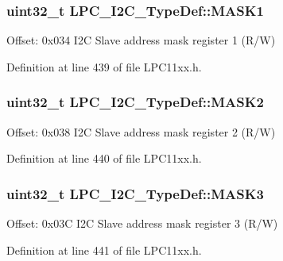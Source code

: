 \subsubsection[{\texorpdfstring{M\+A\+S\+K1}{MASK1}}]{ uint32\+\_\+t L\+P\+C\+\_\+\+I2\+C\+\_\+\+Type\+Def\+::\+M\+A\+S\+K1}\hypertarget{group___l_p_c11xx___definitions_ga8d9d4bb3ddf1de0ffdf8d9fb42488ad1}{}\label{group___l_p_c11xx___definitions_ga8d9d4bb3ddf1de0ffdf8d9fb42488ad1}
Offset\+: 0x034 I2C Slave address mask register 1 (R/W) 

Definition at line 439 of file L\+P\+C11xx.\+h.

\subsubsection[{\texorpdfstring{M\+A\+S\+K2}{MASK2}}]{ uint32\+\_\+t L\+P\+C\+\_\+\+I2\+C\+\_\+\+Type\+Def\+::\+M\+A\+S\+K2}\hypertarget{group___l_p_c11xx___definitions_ga812c5823d41baf9e0ae59dc229994819}{}\label{group___l_p_c11xx___definitions_ga812c5823d41baf9e0ae59dc229994819}
Offset\+: 0x038 I2C Slave address mask register 2 (R/W) 

Definition at line 440 of file L\+P\+C11xx.\+h.

\subsubsection[{\texorpdfstring{M\+A\+S\+K3}{MASK3}}]{ uint32\+\_\+t L\+P\+C\+\_\+\+I2\+C\+\_\+\+Type\+Def\+::\+M\+A\+S\+K3}\hypertarget{group___l_p_c11xx___definitions_ga3dca11db526cd0cbe627dd3d17b3f322}{}\label{group___l_p_c11xx___definitions_ga3dca11db526cd0cbe627dd3d17b3f322}
Offset\+: 0x03C I2C Slave address mask register 3 (R/W) 

Definition at line 441 of file L\+P\+C11xx.\+h.

